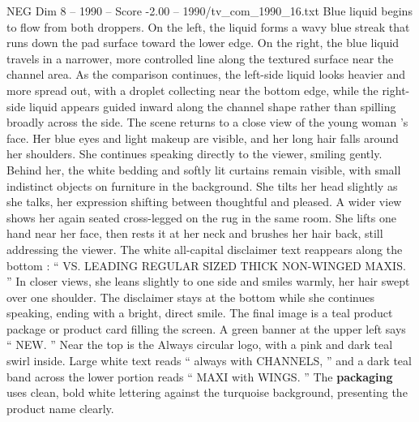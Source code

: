 \begin{textsample}{NEG Dim 8 – 1990 – Score -2.00 – 1990/tv\_com\_1990\_16.txt}
Blue liquid begins to flow from both droppers.
On the left, the liquid forms a wavy blue streak that runs down the pad surface toward the lower edge.
On the right, the blue liquid travels in a narrower, more controlled line along the textured surface near the channel area.
As the comparison continues, the left-side liquid looks heavier and more spread out, with a droplet collecting near the bottom edge, while the right-side liquid appears guided inward along the channel shape rather than spilling broadly across the side.
The scene returns to a close view of the young woman ’s face.
Her blue eyes and light makeup are visible, and her long hair falls around her shoulders.
She continues speaking directly to the viewer, smiling gently.
Behind her, the white bedding and softly lit curtains remain visible, with small indistinct objects on furniture in the background.
She tilts her head slightly as she talks, her expression shifting between thoughtful and pleased.
A wider view shows her again seated cross-legged on the rug in the same room.
She lifts one hand near her face, then rests it at her neck and brushes her hair back, still addressing the viewer.
The white all-capital disclaimer text reappears along the bottom : “ VS.
LEADING REGULAR SIZED THICK NON-WINGED MAXIS. ” In closer views, she leans slightly to one side and smiles warmly, her hair swept over one shoulder.
The disclaimer stays at the bottom while she continues speaking, ending with a bright, direct smile.
The final image is a teal product package or product card filling the screen.
A green banner at the upper left says “ NEW. ” Near the top is the Always circular logo, with a pink and dark teal swirl inside.
Large white text reads “ always with CHANNELS, ” and a dark teal band across the lower portion reads “ MAXI with WINGS. ” The \textbf{packaging} uses clean, bold white lettering against the turquoise background, presenting the product name clearly.

\end{textsample}

